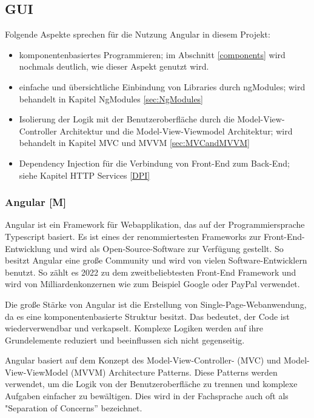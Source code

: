 \subsection{GUI}
Folgende Aspekte sprechen für die Nutzung Angular in diesem Projekt:

\begin{itemize}
  \item komponentenbasiertes Programmieren;
  im Abschnitt \ref{components} wird nochmals deutlich, wie dieser Aspekt genutzt wird.
  \item einfache und übersichtliche Einbindung von Libraries durch ngModules; wird behandelt in Kapitel NgModules \ref{sec:NgModules} 
  \item Isolierung der Logik mit der Benutzeroberfläche durch die Model-View-Controller Architektur und die Model-View-Viewmodel Architektur; wird behandelt in Kapitel MVC und MVVM \ref{sec:MVCandMVVM} 
  \item 
  Dependency Injection für die Verbindung von Front-End zum Back-End; siehe Kapitel HTTP Services \ref{DPI}
\end{itemize}

\subsubsection{Angular [M]}
Angular ist ein Framework für Webapplikation, das auf der Programmiersprache Typescript basiert. Es ist eines der renommiertesten Frameworks zur Front-End-Entwicklung und wird als Open-Source-Software zur Verfügung gestellt. So besitzt Angular eine große Community und wird von vielen Software-Entwicklern benutzt. So zählt es 2022 zu dem zweitbeliebtesten Front-End Framework \cite{AngularEvidence} und wird von Milliardenkonzernen wie zum Beispiel Google oder PayPal verwendet. 
\cite{AngularEvidence2}

Die große Stärke von Angular ist die Erstellung von Single-Page-Webanwendung, da es eine komponentenbasierte Struktur besitzt. Das bedeutet, der Code ist wiederverwendbar und verkapselt. Komplexe Logiken werden auf ihre Grundelemente reduziert und beeinflussen sich nicht gegenseitig. \cite{AngularGeneral}

Angular basiert auf dem Konzept des Model-View-Controller- (MVC) und Model-View-ViewModel (MVVM) Architecture Patterns. Diese Patterns werden verwendet, um die Logik von der Benutzeroberfläche zu trennen und komplexe Aufgaben einfacher zu bewältigen. Dies wird in der Fachsprache auch oft als "Separation of Concerns” bezeichnet.
\cite{AngularArchitecturePattern}

